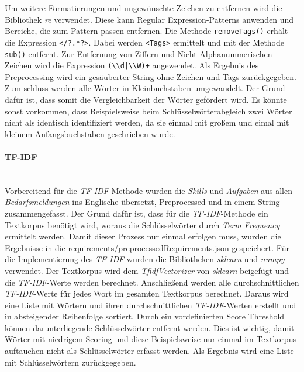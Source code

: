 Um weitere Formatierungen und ungewünschte Zeichen zu entfernen wird die Bibliothek \emph{re} verwendet. Diese kann Regular Expression-Patterns anwenden und Bereiche, die zum Pattern passen entfernen.
%	
Die Methode \lstinline{removeTags()} erhält die Expression \lstinline{</?.*?>}. Dabei werden \lstinline{<Tags>} ermittelt und mit der Methode \lstinline{sub()} entfernt. Zur Entfernung von Ziffern und Nicht-Alphanummerischen Zeichen wird die Expression \lstinline{(\\d|\\W)+} angewendet. Als Ergebnis des Preprocessing wird ein gesäuberter String ohne Zeichen und Tags zurückgegeben. Zum schluss werden alle Wörter in Kleinbuchstaben umgewandelt. Der Grund dafür ist, dass somit die Vergleichbarkeit der Wörter gefördert wird. Es könnte sonst vorkommen, dass Beispielsweise beim Schlüsselwörterabgleich zwei Wörter nicht als identisch identifiziert werden, da sie einmal mit großem und eimal mit kleinem Anfangsbuchstaben geschrieben wurde.
\paragraph{TF-IDF}\label{tfidf}\mbox{}\\
Vorbereitend für die \emph{TF-IDF}-Methode wurden die \emph{Skills} und \emph{Aufgaben} aus allen \emph{Bedarfsmeldungen} ins Englische übersetzt, Preprocessed und in einem String zusammengefasst. Der Grund dafür ist, dass für die \emph{TF-IDF}-Methode ein Textkorpus benötigt wird, woraus die Schlüsselwörter durch \emph{Term Frequency} ermittelt werden. Damit dieser Prozess nur einmal erfolgen muss, wurden die Ergebnisse in die \url{requirements/preprocessedRequirements.json} gespeichert. Für die Implementierung des \emph{TF-IDF} wurden die Bibliotheken \emph{sklearn} und \emph{numpy} verwendet. Der Textkorpus wird dem \emph{TfidfVectorizer} von \emph{sklearn} beigefügt und die \emph{TF-IDF}-Werte werden berechnet. Anschließend werden alle durchschnittlichen \emph{TF-IDF}-Werte für jedes Wort im gesamten Textkorpus berechnet. Daraus wird eine Liste mit Wörtern und ihren durchschnittlichen \emph{TF-IDF}-Werten erstellt und in absteigender Reihenfolge sortiert. Durch ein vordefinierten Score Threshold können darunterliegende Schlüsselwörter entfernt werden. Dies ist wichtig, damit Wörter mit niedrigem Scoring und diese Beispielsweise nur einmal im Textkorpus auftauchen nicht als Schlüsselwörter erfasst werden. Als Ergebnis wird eine Liste mit Schlüsselwörtern zurückgegeben.

